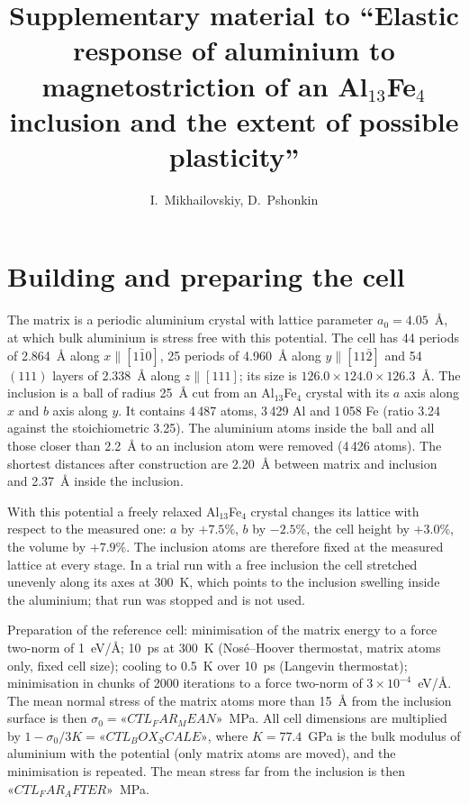 \documentclass[11pt,a4paper]{article}
\title{Supplementary material to ``Elastic response of aluminium to magnetostriction of an Al$_{13}$Fe$_4$
inclusion and the extent of possible plasticity''}
\author{I.~Mikhailovskiy, D.~Pshonkin}
\date{}
\begin{document}
\maketitle

\section{Building and preparing the cell}

The matrix is a periodic aluminium crystal with lattice parameter
$a_0=4.05$~\AA{}, at which bulk aluminium is stress free with this potential.
The cell has 44 periods of 2.864~\AA{} along $x\parallel[1\bar10]$, 25 periods
of 4.960~\AA{} along $y\parallel[11\bar2]$ and 54 $(111)$ layers of 2.338~\AA{}
along $z\parallel[111]$; its size is $126.0\times124.0\times126.3$~\AA{}. The inclusion is a
ball of radius 25~\AA{} cut from an Al$_{13}$Fe$_4$ crystal with its $a$ axis
along $x$ and $b$ axis along $y$. It contains 4\,487 atoms, 3\,429 Al and
1\,058 Fe (ratio 3.24 against the stoichiometric 3.25). The aluminium atoms
inside the ball and all those closer than 2.2~\AA{} to an inclusion atom were
removed (4\,426 atoms). The shortest distances after construction are
2.20~\AA{} between matrix and inclusion and 2.37~\AA{} inside the inclusion.

With this potential a freely relaxed Al$_{13}$Fe$_4$ crystal changes its
lattice with respect to the measured one: $a$ by $+7.5\%$, $b$ by $-2.5\%$,
the cell height by $+3.0\%$, the volume by $+7.9\%$. The inclusion
atoms are therefore fixed at the measured lattice at every stage. In a trial run with a
free inclusion the cell stretched unevenly along its axes at 300~K, which
points to the inclusion swelling inside the aluminium; that run was stopped
and is not used.

Preparation of the reference cell: minimisation of the matrix energy to a
force two-norm of 1~eV/\AA{}; 10~ps at 300~K (Nos\'e--Hoover thermostat,
matrix atoms only, fixed cell size); cooling to 0.5~K over 10~ps (Langevin
thermostat); minimisation in chunks of 2000 iterations to a force two-norm of
$3\times10^{-4}$~eV/\AA{}. The mean normal stress of the matrix atoms more than
15~\AA{} from the inclusion surface is then $\sigma_0=«CTL_FAR_MEAN»$~MPa.
All cell dimensions are multiplied by $1-\sigma_0/3K=«CTL_BOX_SCALE»$, where
$K=77.4$~GPa is the bulk modulus of aluminium with the potential (only matrix
atoms are moved), and the minimisation is repeated. The mean stress far from
the inclusion is then $«CTL_FAR_AFTER»$~MPa.
\end{document}
